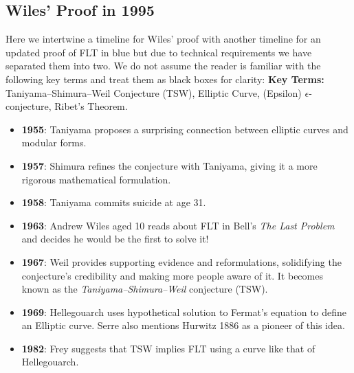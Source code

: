 \documentclass{article}
\theoremstyle{definition}
\theoremstyle{definition}
\theoremstyle{definition}
\begin{document}
\subsection{Wiles' Proof in 1995}

Here we intertwine a timeline for Wiles' proof with another timeline for an updated proof of FLT in blue but due to technical requirements we have separated them into two. We do not assume the reader is familiar with the following key terms and treat them as black boxes for clarity:
\newline\newline
\textbf{Key Terms:} Taniyama–Shimura–Weil Conjecture (TSW), Elliptic Curve, (Epsilon) $\epsilon$-conjecture, Ribet’s Theorem.




\begin{itemize}



\item \textbf{1955}: Taniyama proposes a surprising connection between elliptic curves and modular forms. 

\item \textbf{1957}: Shimura refines the conjecture with Taniyama, giving it a more rigorous mathematical formulation.

\item \textbf{1958}: Taniyama commits suicide at age 31.

\item \textbf{1963}: Andrew Wiles aged 10 reads about FLT in Bell's \emph{The Last Problem} and decides he would be the first to solve it!

\item \textbf{1967}: Weil provides supporting evidence and reformulations, solidifying the conjecture’s credibility and making more people aware of it. It becomes known as the \emph{Taniyama–Shimura–Weil} conjecture (TSW). 



\item \textbf{1969}: Hellegouarch uses hypothetical solution to Fermat's equation to define an Elliptic curve. Serre also mentions Hurwitz 1886 as a pioneer of this idea.






\item \textbf{1982}: Frey suggests that TSW implies FLT using a curve like that of Hellegouarch.



\end{itemize}
\end{document}
